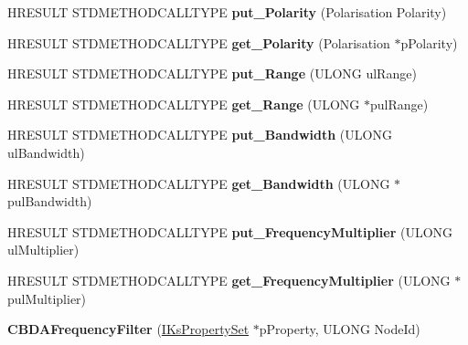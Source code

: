 \begin{DoxyCompactItemize}
H\+R\+E\+S\+U\+LT S\+T\+D\+M\+E\+T\+H\+O\+D\+C\+A\+L\+L\+T\+Y\+PE {\bfseries put\+\_\+\+Polarity} (Polarisation Polarity)
\item 
\mbox{\label{class_c_b_d_a_frequency_filter_a333fe4bcd5ce762b750d7d5cf9c1f870}} 
H\+R\+E\+S\+U\+LT S\+T\+D\+M\+E\+T\+H\+O\+D\+C\+A\+L\+L\+T\+Y\+PE {\bfseries get\+\_\+\+Polarity} (Polarisation $\ast$p\+Polarity)
\item 
\mbox{\label{class_c_b_d_a_frequency_filter_a355a084cf43e8373ba4a090ba29c859a}} 
H\+R\+E\+S\+U\+LT S\+T\+D\+M\+E\+T\+H\+O\+D\+C\+A\+L\+L\+T\+Y\+PE {\bfseries put\+\_\+\+Range} (U\+L\+O\+NG ul\+Range)
\item 
\mbox{\label{class_c_b_d_a_frequency_filter_ac9879c2223d27932f1cc1627436a8bee}} 
H\+R\+E\+S\+U\+LT S\+T\+D\+M\+E\+T\+H\+O\+D\+C\+A\+L\+L\+T\+Y\+PE {\bfseries get\+\_\+\+Range} (U\+L\+O\+NG $\ast$pul\+Range)
\item 
\mbox{\label{class_c_b_d_a_frequency_filter_a4336e6f48ba5e18da8e55bb7d49539ff}} 
H\+R\+E\+S\+U\+LT S\+T\+D\+M\+E\+T\+H\+O\+D\+C\+A\+L\+L\+T\+Y\+PE {\bfseries put\+\_\+\+Bandwidth} (U\+L\+O\+NG ul\+Bandwidth)
\item 
\mbox{\label{class_c_b_d_a_frequency_filter_ae5c0aa7a3f0c90e3194a3e5c8a69b080}} 
H\+R\+E\+S\+U\+LT S\+T\+D\+M\+E\+T\+H\+O\+D\+C\+A\+L\+L\+T\+Y\+PE {\bfseries get\+\_\+\+Bandwidth} (U\+L\+O\+NG $\ast$pul\+Bandwidth)
\item 
\mbox{\label{class_c_b_d_a_frequency_filter_aa1643909c887b25c2275550fcdb1996e}} 
H\+R\+E\+S\+U\+LT S\+T\+D\+M\+E\+T\+H\+O\+D\+C\+A\+L\+L\+T\+Y\+PE {\bfseries put\+\_\+\+Frequency\+Multiplier} (U\+L\+O\+NG ul\+Multiplier)
\item 
\mbox{\label{class_c_b_d_a_frequency_filter_af0eece07d8964935984fdc0f4c3b20f6}} 
H\+R\+E\+S\+U\+LT S\+T\+D\+M\+E\+T\+H\+O\+D\+C\+A\+L\+L\+T\+Y\+PE {\bfseries get\+\_\+\+Frequency\+Multiplier} (U\+L\+O\+NG $\ast$pul\+Multiplier)
\item 
\mbox{\label{class_c_b_d_a_frequency_filter_aee580fab214cde4fbd0c3e53876a8552}} 
{\bfseries C\+B\+D\+A\+Frequency\+Filter} (\hyperlink{interface_i_ks_property_set}{I\+Ks\+Property\+Set} $\ast$p\+Property, U\+L\+O\+NG Node\+Id)
\end{DoxyCompactItemize}
